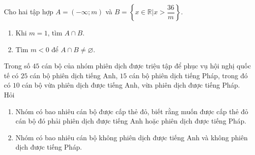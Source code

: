 \begin{bt}%
	Cho hai tập hợp $A=(-\infty;m)$ và $B=\left\{ x\in \mathbb{R}|x>\dfrac{36}{m}\right\}$.
	\begin{enumerate}
		\item Khi $m=1$, tìm $A\cap B$.
		\item Tìm $m<0$ để $A\cap B\neq \varnothing$.
	\end{enumerate}
\end{bt}

\begin{bt}%
	Trong số $45$ cán bộ của nhóm phiên dịch được triệu tập để phục vụ hội nghị quốc tế có $25$ cán bộ phiên dịch tiếng Anh, $15$ cán bộ phiên dịch tiếng Pháp, trong đó có $10$ cán bộ vừa phiên dịch được tiếng Anh, vừa phiên dịch được tiếng Pháp. Hỏi
	\begin{enumerate}
		\item Nhóm có bao nhiêu cán bộ được cấp thẻ đỏ, biết rằng muốn được cấp thẻ đỏ cán bộ đó phải phiên dịch được tiếng Anh hoặc phiên dịch được tiếng Pháp.
		\item Nhóm có bao nhiêu cán bộ không phiên dịch được tiếng Anh và không phiên dịch được tiếng Pháp.
	\end{enumerate}
\end{bt}

